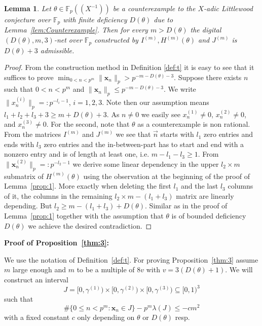 \documentclass{article}
\newcommand{\bsx}{\boldsymbol{x}}%
\newcommand{\FF}{\mathbb{F}}
\renewcommand{\(}{\left (}
\renewcommand{\)}{\right )}
\newtheorem{lemma}[theorem]{Lemma}
\theoremstyle{definition}
\numberwithin{equation}{section}
\begin{document}
\begin{lemma}\label{lem:admissible}
Let $\theta\in\FF_p((X^{-1}))$ be a counterexample to the $X$-adic Littlewood conjecture over $\FF_p$ with finite deficiency $D(\theta)$ due to Lemma~\ref{lem:Counterexample}. Then for every $m>D(\theta)$ the digital $(D(\theta),m,3)$-net over $\FF_p$ constructed by $I^{(m)},H^{(m)}(\theta)$ and $J^{(m)}$ is $D(\theta)+3$ admissible. 
\end{lemma}
\begin{proof}From the construction method in Definition \ref{def:t} it is easy to see that it suffices to prove $\min_{0 < n<p^m}\|\bsx_n\|_p>p^{-m-D(\theta)-3}$. 
Suppose there exists $n$ such that $0<n<p^m$ and $\|\bsx_n\|_p\leq p^{-m-D(\theta)-3}$. We write $\|x^{(i)}_n\|_p=:p^{-l_i-1}$, $i=1,2,3$. Note then our assumption means $l_1+l_2+l_3+3\geq m+D(\theta)+3$. 
As $n\neq 0$ we easily see $x_n^{(1)}\neq 0$, $x_n^{(2)}\neq 0$, and $x_n^{(3)}\neq 0$. For the second, note that $\theta$ as a counterexample is non rational. From the matrices $I^{({m})}$ and $J^{(m)}$ we see that $\vec{n}$ starts with $l_1$ zero entries and ends with $l_3$ zero entries and the in-between-part has to start and end with a nonzero entry and is of length at least one, i.e. $m-l_1-l_3\geq 1$. 
From $\|\bsx^{(2)}_n\|_p=:p^{-l_2-1}$ we derive some linear dependency in the upper $l_2\times m$ submatrix of $H^{(m)}(\theta)$ using the observation at the beginning of the proof of Lemma~\ref{prop:1}. More exactly when deleting the first $l_1$ and the last $l_3$ columns of it, the columns in the remaining $l_2\times m-(l_1+l_3)$ matrix are linearly depending. But $l_2\geq m-(l_1+l_3)+D(\theta)$. Similar as in the proof of Lemma~\ref{prop:1} together with the assumption that $\theta$ is of bounded deficiency $D(\theta)$ we achieve the desired contradiction. 
\end{proof}


\textbf{Proof of Proposition~\ref{thm:3}: }

We use the notation of Definition~\ref{def:t}. For proving Proposition~\ref{thm:3} assume $m$ large enough and $m$ to be a multiple of $8v$ with $v=3(D(\theta)+1)$. We will construct an interval $$J=[0,\gamma^{(1)})\times [0,\gamma^{(2)})\times [0,\gamma^{(3)})\subseteq [0,1)^3$$ such that 
\begin{equation}\label{eq:lb} 
\#\{0\leq n<p^m:\bsx_n\in J\}-p^m\lambda (J)\leq - c m^2
\end{equation}
with a fixed constant $c$ only depending on $\theta$ or $D(\theta)$ resp.  
\end{document}
